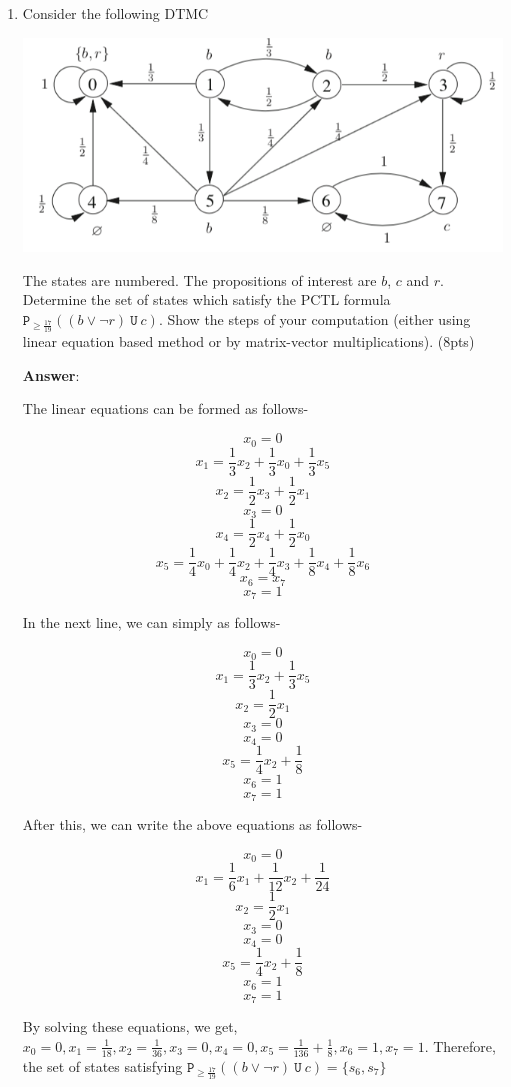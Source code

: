 \documentclass[11pt]{article}
\newcommand{\lu}[2]{(#1\ \texttt{U}\ #2)}
\begin{document}
\begin{enumerate}

\item 
Consider the following DTMC

\begin{center}
\includegraphics[scale=0.5]{images/dtmc-hw-katoen.png}
\end{center}
The states are numbered. The propositions of interest are $b$, $c$ and
$r$. Determine the set of states which satisfy the PCTL formula
$\mathtt{P}_{\geq \frac{17}{19}}\lu{(b\lor\neg r)}{c}$. Show the steps of your computation
(either using linear equation based method or by matrix-vector multiplications).
\hfill(8pts)

\textbf{Answer}:


The linear equations can be formed as follows- 

\[x_0=0\]
\[x_1=\frac{1}{3}x_2 + \frac{1}{3}x_0 + \frac{1}{3}x_5\]
\[x_2 = \frac{1}{2}x_3 + \frac{1}{2}x_1\]
\[x_3=0\]
\[x_4=\frac{1}{2}x_4 + \frac{1}{2}x_0\]
\[x_5 = \frac{1}{4}x_0 + \frac{1}{4}x_2 + \frac{1}{4}x_3 + \frac{1}{8}x_4 + \frac{1}{8}x_6 \]
\[x_6 = x_7\]
\[x_7=1\]

In the next line, we can simply as follows- 

\[x_0=0\]
\[x_1=\frac{1}{3}x_2 + \frac{1}{3}x_5\]
\[x_2 = \frac{1}{2}x_1\]
\[x_3=0\]
\[x_4=0\]
\[x_5 =  \frac{1}{4}x_2 + \frac{1}{8} \]
\[x_6 = 1\]
\[x_7=1\]

After this, we can write the above equations as follows- 

\[x_0=0\]
\[x_1=\frac{1}{6}x_1 + \frac{1}{12} x_2 + \frac{1}{24}\]
\[x_2 = \frac{1}{2}x_1\]
\[x_3=0\]
\[x_4=0\]
\[x_5 =  \frac{1}{4}x_2 + \frac{1}{8} \]
\[x_6 = 1\]
\[x_7=1\]

By solving these equations, we get, \(x_0=0, x_1=\frac{1}{18}, 
x_2=\frac{1}{36}, x_3=0, x_4=0, x_5=\frac{1}{136}+\frac{1}{8}, x_6=1, x_7=1\). Therefore, the set of states satisfying $\mathtt{P}_{\geq \frac{17}{19}}\lu{(b\lor\neg r)}{c} = \{s_6, s_7\}$




\end{enumerate}
\end{document}
